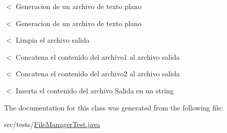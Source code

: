 $<$ Generacion de un archivo de texto plano

$<$ Generacion de un archivo de texto plano

$<$ Limpia el archivo \textquotesingle{}salida\textquotesingle{}

$<$ Concatena el contenido del archivo1 al archivo salida

$<$ Concatena el contenido del archivo2 al archivo salida

$<$ Inserta el contenido del archivo Salida en un string 

The documentation for this class was generated from the following file\+:\begin{DoxyCompactItemize}
\item 
src/tests/\hyperlink{_file_manager_test_8java}{File\+Manager\+Test.\+java}\end{DoxyCompactItemize}
